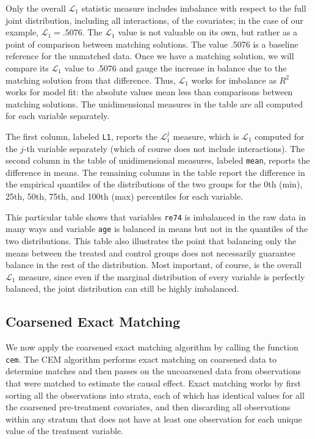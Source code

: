 \documentclass[11pt,titlepage]{article}
\begin{document}
Only the overall $\mathcal L_1$ statistic measure includes imbalance with
respect to the full joint distribution, including all interactions, of the
covariates; in the case of our example, $\mathcal L_1=.5076$. The
$\mathcal L_1$ value is not valuable on its own, but rather as a point of
comparison between matching solutions. The value .5076 is a baseline
reference for the unmatched data. Once we have a matching solution, we
will compare its $\mathcal L_1$ value to .5076 and gauge the increase in
balance due to the matching solution from that difference. Thus, $\mathcal
L_1$ works for imbalance as $R^2$ works for model fit: the absolute values
mean less than comparisons between matching solutions. The unidimensional
measures in the table are all computed for each variable separately.

The first column, labeled \texttt{L1}, reports the $\mathcal L_1^j$
measure, which is $\mathcal L_1$ computed for the $j$-th variable
separately (which of course does not include interactions).  The second
column in the table of unidimensional measures, labeled \texttt{mean},
reports the difference in means.  The remaining columns in the table
report the difference in the empirical quantiles of the distributions of
the two groups for the 0th (min), 25th, 50th, 75th, and 100th (max)
percentiles for each variable. 

This particular table shows that variables \texttt{re74} is imbalanced in
the raw data in many ways and variable \texttt{age} is balanced in means
but not in the quantiles of the two distributions.  This table also
illustrates the point that balancing only the means between the treated
and control groups does not necessarily guarantee balance in the rest of
the distribution.  Most important, of course, is the overall $\mathcal
L_1$ measure, since even if the marginal distribution of every variable is
perfectly balanced, the joint distribution can still be highly imbalanced.

\subsection{Coarsened Exact Matching}\label{sec:cem}

We now apply the coarsened exact matching algorithm by calling the
function \texttt{cem}.  The CEM algorithm performs exact matching on
coarsened data to determine matches and then passes on the uncoarsened
data from observations that were matched to estimate the causal
effect.  Exact matching works by first sorting all the observations
into strata, each of which has identical values for all the coarsened
pre-treatment covariates, and then discarding all observations within
any stratum that does not have at least one observation for each
unique value of the treatment variable.
\end{document}
